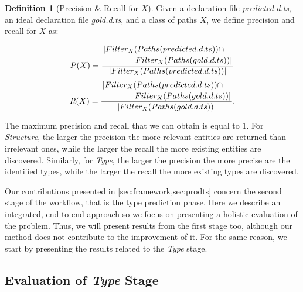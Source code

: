 \documentclass[sigplan,10pt,anonymous]{acmart} %
\theoremstyle{plain}
\theoremstyle{remark}
\theoremstyle{definition}
\newtheorem{defn}{Definition}[section]
\begin{document}
\begin{defn}[Precision \& Recall for $X$] \label{def:precision_recall}
  Given a declaration file \textit{predicted.d.ts}, an ideal declaration file \textit{gold.d.ts}, and a class of paths $X$, we define precision and recall for $X$ as:

  \begin{equation}
    P(X) =
    \dfrac{\splitdfrac{|Filter_X(Paths(predicted.d.ts)) \cap}{Filter_X(Paths(gold.d.ts)) |}}{|Filter_X(Paths(predicted.d.ts)) |}
  \end{equation}
  \begin{equation}
    R(X) =
    \dfrac{\splitdfrac{|Filter_X(Paths(predicted.d.ts)) \cap} {Filter_X(Paths(gold.d.ts)) |}}
    {|Filter_X(Paths(gold.d.ts))|}.
  \end{equation}
\end{defn}

The maximum precision and recall that we can obtain is equal to $1$.
For \textit{Structure}, the larger the precision the more relevant entities are returned than irrelevant ones, while the larger the recall the more existing entities are discovered.
Similarly, for \textit{Type}, the larger the precision the more precise are the identified types, while the larger the recall the more existing types are discovered.

Our contributions presented in \cref{sec:framework,sec:prodts} concern the second stage of the workflow, that is the type prediction phase.
Here we describe an integrated, end-to-end approach so we focus on presenting a holistic evaluation of the problem.
Thus, we will present results from the first stage too, although our method does not contribute to the improvement of it.
For the same reason, we start by presenting the results related to the \textit{Type} stage.

\subsection{Evaluation of \textit{Type} Stage}
\end{document}
